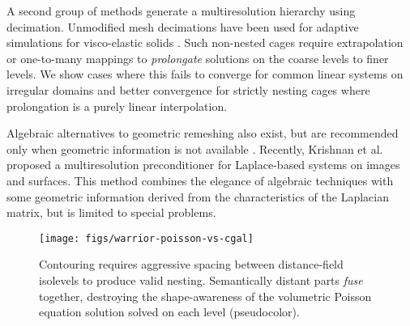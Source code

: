A second group of methods generate a multiresolution hierarchy using decimation. Unmodified mesh decimations \cite{Garland:1997:SSU} have been used for adaptive
simulations for visco-elastic solids \cite{Debunne:2001:DRD}.
%
Such non-nested cages require extrapolation or one-to-many mappings to
\emph{prolongate} solutions on the coarse levels to finer levels.
%
We show cases where this fails to converge for common linear systems on
irregular domains and better convergence for strictly nesting cages where
prolongation is a purely linear interpolation.

Algebraic alternatives to geometric remeshing also exist,
but are recommended only when geometric information is not available
\cite{falgout06}.
%
Recently, Krishnan et al.  proposed a
multiresolution preconditioner for Laplace-based systems on images and
surfaces.
%
This method combines the elegance of algebraic techniques with some geometric
information derived from the characteristics of the Laplacian matrix, but is
limited to special problems.

\begin{figure}
  \texttt{[image: figs/warrior-poisson-vs-cgal]}
  \caption{Contouring requires aggressive spacing between distance-field
  isolevels to produce valid nesting. Semantically distant parts \emph{fuse}
  together, destroying the shape-awareness of the volumetric Poisson equation
  solution solved on each level (pseudocolor).} 
  \label{fig:warrior-poisson}
\end{figure}

